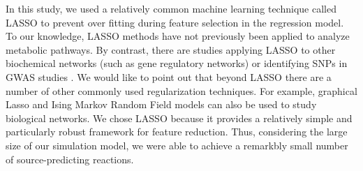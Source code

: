 \documentclass[12pt]{article}
\begin{document}


In this study, we used a relatively common machine learning technique called LASSO to prevent over fitting during feature selection in the regression model. To our knowledge, LASSO methods have not previously been applied to analyze metabolic pathways. By contrast, there are studies applying LASSO to other biochemical networks (such as gene regulatory networks) \cite{Menendezetal2010} or identifying SNPs in GWAS studies \cite{Wuetal2009}. We would like to point out that beyond LASSO there are a number of other commonly used regularization techniques. For example, graphical Lasso \cite{Friedmanetal2008} and Ising Markov Random Field models \cite{Ravikumaretal2010} can also be used to study biological networks. We chose LASSO because it provides a relatively simple and particularly robust framework for feature reduction. Thus, considering the large size of our simulation model, we were able to achieve a remarkbly small number of source-predicting reactions.
\end{document}
